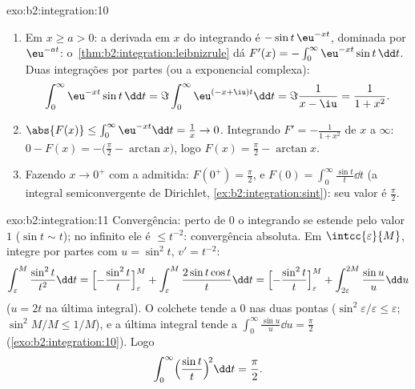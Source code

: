 \begin{solution}{exo:b2:integration:10}
\begin{enumerate}
  \item Em $x \geq a > 0$: a derivada em $x$ do integrando é
        $-\sin t\,\eu^{-xt}$, dominada por $\eu^{-at}$:
        o~\cref{thm:b2:integration:leibnizrule} dá $F'(x) =
        -\int_0^\infty \eu^{-xt}\sin t\,\dd t$. Duas integrações por
        partes (ou a exponencial complexa):
        \[
        \int_0^\infty \eu^{-xt}\sin t\,\dd t
        = \Im \int_0^\infty \eu^{(-x+\iu)t}\dd t
        = \Im\frac{1}{x - \iu} = \frac{1}{1 + x^2} .
        \]
  \item $\abs{F(x)} \leq \int_0^\infty \eu^{-xt}\dd t = \frac1x \to
        0$. Integrando $F' = -\frac{1}{1+x^2}$ de $x$ a
        $\infty$: $0 - F(x) = -\bigl(\frac\pi2 - \arctan x\bigr)$,
        logo $F(x) = \frac\pi2 - \arctan x$.
  \item Fazendo $x \to 0^+$ com a  admitida: $F(0^+) =
        \frac\pi2$, e $F(0) = \int_0^\infty \frac{\sin t}{t}\dd
        t$ (a integral semiconvergente de Dirichlet,
        \cref{ex:b2:integration:sint}): seu valor é
        $\frac\pi2$.
\end{enumerate}
\end{solution}

\begin{solution}{exo:b2:integration:11}
Convergência: perto de $0$ o integrando se estende  pelo
valor $1$ ($\sin t \sim t$); no infinito ele é $\leq t^{-2}$:
convergência absoluta. Em $\intcc{\varepsilon}{M}$, integre por
partes com $u = \sin^2 t$, $v' = t^{-2}$:
\[
\int_\varepsilon^M \frac{\sin^2 t}{t^2}\dd t
= \Bigl[-\frac{\sin^2 t}{t}\Bigr]_\varepsilon^M
+ \int_\varepsilon^M \frac{2\sin t\cos t}{t}\dd t
= \Bigl[-\frac{\sin^2 t}{t}\Bigr]_\varepsilon^M
+ \int_{2\varepsilon}^{2M} \frac{\sin u}{u}\dd u
\]
($u = 2t$ na última integral). O colchete tende a $0$ nas duas
pontas ($\sin^2\varepsilon/\varepsilon \leq \varepsilon$;
$\sin^2 M/M \leq 1/M$), e a última integral tende a
$\int_0^\infty \frac{\sin u}{u}\dd u = \frac\pi2$
(\cref{exo:b2:integration:10}). Logo
\[
\int_0^\infty \Bigl(\frac{\sin t}{t}\Bigr)^{\!2}\dd t
= \frac\pi2 .
\]
\end{solution}

